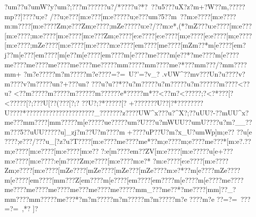 {{{{{{{{{{{{{{{{{{{{{{{{{{{{{{{{{{{{{{{{{{{{{{{{{{{{{{{{{{{{{{{{{{{{{{{{{{{{{{{{{{{{{{{{{{{{{{{{{{{{{{{{{{{{{{{{{{{{{{{{{{{{{{{{{{{{{{{{{{{{{{{{{{{{{{{{{{{{{{{{{{{{{{{{{{{{{{{{{{{{{{{{{{{{{{{{{{{{{{{{{{{{{{{{{{{{{{{{{{{{{{{{{{{{{{{{{{{{{{{{{{{{{{{{{{{{{{{{{{{{{{{{{{{{{{{{{{{{{{{{{{{{{{{{{{{{{{{{{{{{{{{{{{{{{{{{{{{{{{{{{{{{{{{{{{{{{{{{{{{{{{{{{{{{{{{{{{{{{{{{{{{{{{{{{{{{{{{{{{{{{{{{{{{{{{{{{{{{{{{{{{{{{{{{{{{{{{{{{{{{{{{{{{{{{{{{{{{{{{{{{{{{{{{{{{{{{{{{{{{{{{{{{{{{{{{{{{{{{{{{{{{{{{{{{{{{{{{{{{{{{{{{{{{{{{{{{{{{{{{{{{{{{{{{{{{{{{{{{{{{{{{{{{{{{{{{{{{{{{{{{{{{{{{{{{{{{{{{{{{{{{{{{{{{{{{{{{{{{{{{{{{{{{{{{{{{{{{{{{{{{{{{{{{{{{{{{{{{{{{{{{{{{{{{{{{{{{{{{{{{{{{{{{{{{{{{{{{{{{{{{{{{{{{{{{{{{{{{{{{{{{{{{{{{{{{{{{{{{{{{{{{{{{{{{{{{{{{{{{{{{{{{{{{{{{{{{{{{{{{{{{{{{{{{{{{{{{{{{{{{{{{{{{?u{m??u?u{mW?y?u{m?;???}{m??? ???u?/*????u?*?~??u5???uX?z?{m+?W??{m,?????{mp??]????u;e?
/??u;e???[m:e???[m:e?????u;e???u{m?5??{m~??{m:e????[m:e????{m:m????[m:e????Zm;e???Zm;e????;mZe?????u:e?/??{m:e*,(*?}{mZ???u:e????[m:e???[m:e????;m:e????[m:e????[m:e???Zm;e????[e:e????[e:e????[m;e????[e:e????[m;e????[m:e????;mZe????[m:e????[m:e????{m:e????[e{m????[m{e????[mZm??* {m[e????[e{m?j??{m[e???[e{m????[m[e??{m[e????[e{m????{m[e????{m{e????{m[e??*?{m{e????{m[e????{m{e????{m{e????{m{e????{m{e????{m{e?????m{m?????m{m????{m{e?*???m{m???/?m{m??? ?m{m+
 ?m?e?????m?m?????m?e????=?=~U?'=?v_?
.\?vUW^??mv???Un?u????v?m????v?m?????un?+???un?
???u?u??*??u?m?????u?m?????u?m?????}?m????<??u?
<??m??? ??m??? ??m?????}?m?????}?e*????}?m *??<??m ?<?????;?<?*???[?<?????[?;???U[??(???[?;?
??U{?;?*?????[?
+???{????U??|? *????????U????*?????? ???????????????_??{?? ???z?{???UW^x???u?^X?;??uUU?-??mUU^x?m{e???m{m????|m{m?????m[e?????u{e?????u{m?U???u?mWUU??u{mU????u?m?__??}{m???5??uUU?????u]_zj?}{m??U?}{m ??{??{m
+???}?uP??U?}{m?x_U?u{mWp]{m;e??
??u[e
????};e???/???u_[?z?u?T????[m:e????{me????{me*??{m;e????{m;e????{me???*[m:e?.??{m;e????[m:e????[m:e????[m:e??
?:e[m????e{m??ZV[m:e????[m:e?????u[e+???{m:e????[m:e????:e[m????Zm;e????[m:e????{m:e?*
?{m:e????[e:e????[m:e????Zm;e????[m:e????[mZe????[mZe????[mZe???[mZe????{m:e?*??{m[e????{mZe????{m[e????[e{m????[m{m???Z[e{m????{m[e????[e{m????[e{m????{m[e????{m[e????{m{e????{m{e????{m{e????{m{e????{m{e???{m{e????{m{e?????m{m_???{m{e??*?{m{e????|m{m]??_?m{m????m{m?????m{e???*?m?m?????m?m?????m?m?????m?e
????m?e ??=?=~???	=?=~,*?
]?~
}}}}}}}}}}}}}}}}}}}}}}}}}}}}}}}}}}}}}}}}}}}}}}}}}}}}}}}}}}}}}}}}}}}}}}}}}}}}}}}}}}}}}}}}}}}}}}}}}}}}}}}}}}}}}}}}}}}}}}}}}}}}}}}}}}}}}}}}}}}}}}}}}}}}}}}}}}}}}}}}}}}}}}}}}}}}}}}}}}}}}}}}}}}}}}}}}}}}}}}}}}}}}}}}}}}}}}}}}}}}}}}}}}}}}}}}}}}}}}}}}}}}}}}}}}}}}}}}}}}}}}}}}}}}}}}}}}}}}}}}}}}}}}}}}}}}}}}}}}}}}}}}}}}}}}}}}}}}}}}}}}}}}}}}}}}}}}}}}}}}}}}}}}}}}}}}}}}}}}}}}}}}}}}}}}}}}}}}}}}}}}}}}}}}}}}}}}}}}}}}}}}}}}}}}}}}}}}}}}}}}}}}}}}}}}}}}}}}}}}}}}}}}}}}}}}}}}}}}}}}}}}}}}}}}}}}}}}}}}}}}}}}}}}}}}}}}}}}}}}}}}}}}}}}}}}}}}}}}}}}}}}}}}}}}}}}}}}}}}}}}}}}}}}}}}}}}}}}}}}}}}}}}}}}}}}}}}}}}}}}}}}}}}}}}}}}}}}}}}}}}}}}}}}}}}}}}}}}}}}}}}}}}}}}}}}}}}}}}}}}}}}}}}}}}}}}}}}}}}}}}}}}}}}}}}}}}}}}}}}}}}}}}}}}}}}}}}}}}}}}}}}}}}}}}}}}}}}}}}}}}}}}}}}}}}}}}}}}}}}}}}}}}}}}}}}}}}}}}}}}}}}}}}}}}}}}}}}}}}}}}}}}}}}}}}}}}}}}}}}}}}}}}}}}}}}}}}}}}}}}}}}}}}}}}}}}}}}}}}}}}}}}}}}}}}}}}}}}}}}}}}}}}}}}}}}}}}}}}}}}}}}
